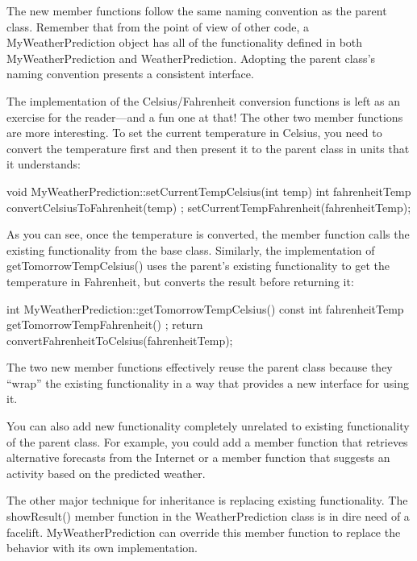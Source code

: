 The new member functions follow the same naming convention as the parent class. Remember that from the point of view of other code, a MyWeatherPrediction object has all of the functionality defined in both MyWeatherPrediction and WeatherPrediction. Adopting the parent class’s naming convention presents a consistent interface.

The implementation of the Celsius/Fahrenheit conversion functions is left as an exercise for the reader—and a fun one at that! The other two member functions are more interesting. To set the current temperature in Celsius, you need to convert the temperature first and then present it to the parent class in units that it understands:

\begin{cpp}
void MyWeatherPrediction::setCurrentTempCelsius(int temp)
{
    int fahrenheitTemp { convertCelsiusToFahrenheit(temp) };
    setCurrentTempFahrenheit(fahrenheitTemp);
}
\end{cpp}

As you can see, once the temperature is converted, the member function calls the existing functionality from the base class. Similarly, the implementation of getTomorrowTempCelsius() uses the parent’s existing functionality to get the temperature in Fahrenheit, but converts the result before returning it:

\begin{cpp}
int MyWeatherPrediction::getTomorrowTempCelsius() const
{
    int fahrenheitTemp { getTomorrowTempFahrenheit() };
    return convertFahrenheitToCelsius(fahrenheitTemp);
}
\end{cpp}

The two new member functions effectively reuse the parent class because they “wrap” the existing functionality in a way that provides a new interface for using it.

You can also add new functionality completely unrelated to existing functionality of the parent class.
For example, you could add a member function that retrieves alternative forecasts from the Internet or a member function that suggests an activity based on the predicted weather.


The other major technique for inheritance is replacing existing functionality. The showResult() member function in the WeatherPrediction class is in dire need of a facelift. MyWeatherPrediction can override this member function to replace the behavior with its own implementation.

